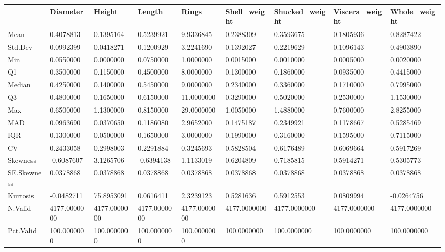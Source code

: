 \documentclass[
  letterpaper,
  DIV=11,
  numbers=noendperiod]{scrreprt}
\begin{document}
\begin{table}
\centering
\begin{tabular}[t]{l|l|l|l|l|l|l|l|l}
\hline
  & Diameter & Height & Length & Rings & Shell\_weight & Shucked\_weight & Viscera\_weight & Whole\_weight\\
\hline
Mean & 0.4078813 & 0.1395164 & 0.5239921 & 9.9336845 & 0.2388309 & 0.3593675 & 0.1805936 & 0.8287422\\
\hline
Std.Dev & 0.0992399 & 0.0418271 & 0.1200929 & 3.2241690 & 0.1392027 & 0.2219629 & 0.1096143 & 0.4903890\\
\hline
Min & 0.0550000 & 0.0000000 & 0.0750000 & 1.0000000 & 0.0015000 & 0.0010000 & 0.0005000 & 0.0020000\\
\hline
Q1 & 0.3500000 & 0.1150000 & 0.4500000 & 8.0000000 & 0.1300000 & 0.1860000 & 0.0935000 & 0.4415000\\
\hline
Median & 0.4250000 & 0.1400000 & 0.5450000 & 9.0000000 & 0.2340000 & 0.3360000 & 0.1710000 & 0.7995000\\
\hline
Q3 & 0.4800000 & 0.1650000 & 0.6150000 & 11.0000000 & 0.3290000 & 0.5020000 & 0.2530000 & 1.1530000\\
\hline
Max & 0.6500000 & 1.1300000 & 0.8150000 & 29.0000000 & 1.0050000 & 1.4880000 & 0.7600000 & 2.8255000\\
\hline
MAD & 0.0963690 & 0.0370650 & 0.1186080 & 2.9652000 & 0.1475187 & 0.2349921 & 0.1178667 & 0.5285469\\
\hline
IQR & 0.1300000 & 0.0500000 & 0.1650000 & 3.0000000 & 0.1990000 & 0.3160000 & 0.1595000 & 0.7115000\\
\hline
CV & 0.2433058 & 0.2998003 & 0.2291884 & 0.3245693 & 0.5828504 & 0.6176489 & 0.6069664 & 0.5917269\\
\hline
Skewness & -0.6087607 & 3.1265706 & -0.6394138 & 1.1133019 & 0.6204809 & 0.7185815 & 0.5914271 & 0.5305773\\
\hline
SE.Skewness & 0.0378868 & 0.0378868 & 0.0378868 & 0.0378868 & 0.0378868 & 0.0378868 & 0.0378868 & 0.0378868\\
\hline
Kurtosis & -0.0482711 & 75.8953091 & 0.0616411 & 2.3239123 & 0.5281636 & 0.5912553 & 0.0809994 & -0.0264756\\
\hline
N.Valid & 4177.0000000 & 4177.0000000 & 4177.0000000 & 4177.0000000 & 4177.0000000 & 4177.0000000 & 4177.0000000 & 4177.0000000\\
\hline
Pct.Valid & 100.0000000 & 100.0000000 & 100.0000000 & 100.0000000 & 100.0000000 & 100.0000000 & 100.0000000 & 100.0000000\\
\hline
\end{tabular}
\end{table}
\end{document}
